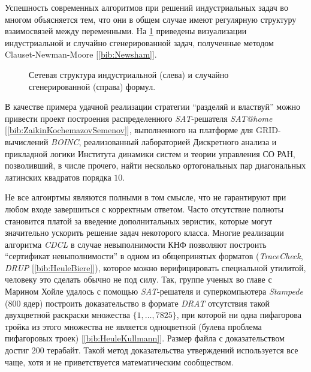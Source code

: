 Успешность современных алгоритмов при решений индустриальных задач во многом объясняется тем, что они в общем случае имеют регулярную структуру взаимосвязей между переменными. На \figurename{ \ref{chapter1:fig:satgraph}} приведены визуализации индустриальной и случайно сгенерированной задач, полученные методом Clauset-Newman-Moore [\ref{bib:Newsham}].

\begin{figure}[h]
\centering
\captionsetup{justification=centering}
\caption{Сетевая структура индустриальной (слева) и случайно сгенерированной (справа) формул.}
\label{chapter1:fig:satgraph}
\end{figure}

В качестве примера удачной реализации стратегии \enquote{разделяй и властвуй} можно привести проект построения распределенного \textit{SAT}-решателя \textit{SAT@home} [\ref{bib:ZaikinKochemazovSemenov}], выполненного на платформе для GRID-вычислений \textit{BOINC}, реализованный лабораторией Дискретного анализа и прикладной логики Института динамики систем и теории управления СО РАН, позволивший, в числе прочего, найти несколько ортогональных пар диагональных латинских квадратов порядка $10$.

Не все алгоиртмы являются полными в том смысле, что не гарантируют при любом входе завершиться с корректным ответом. Часто отсутствие полноты становится платой за введение дополнитальных эвристик, которые могут значительно ускорить решение задач некоторого класса. 
Многие реализации алгоритма \textit{CDCL} в случае невыполнимости КНФ позволяют построить \enquote{сертификат невыполнимости} в одном из общепринятых форматов (\textit{TraceCheck}, \textit{DRUP} [\ref{bib:HeuleBiere}]), которое можно верифицировать специальной утилитой, человеку это сделать обычно не под силу. 
Так, группе ученых во главе с Марином Хойле удалось с помощью \textit{SAT}-решателя и суперкомпьютера \textit{Stampede} ($800$ ядер) построить доказательство в формате \textit{DRAT} отсутствия такой двухцветной раскраски множества $\{1, \dots, 7825\}$, при которой ни одна пифагорова тройка из этого множества не является одноцветной (булева проблема пифагоровых троек) [\ref{bib:HeuleKullmann}]. 
Размер файла с доказательством достиг $200$ терабайт. Такой метод доказательства утверждений используется все чаще, хотя и не приветствуется математическим сообществом.

